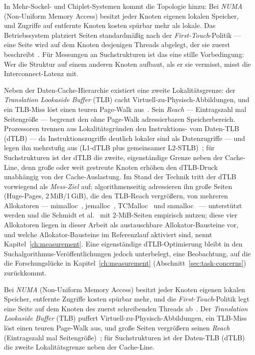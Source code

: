\begin{nurlang}
In Mehr-Sockel- und Chiplet-Systemen kommt die Topologie hinzu: Bei \emph{NUMA} (Non-Uniform Memory
Access) besitzt jeder Knoten eigenen lokalen Speicher, und Zugriffe auf entfernte Knoten kosten
spürbar mehr als lokale. Das Betriebssystem platziert Seiten standardmäßig nach der
\emph{First-Touch}-Politik --- eine Seite wird auf dem Knoten desjenigen Threads abgelegt, der sie zuerst
beschreibt~\cite{lameter2013numa}. Für Messungen an Suchstrukturen ist das eine stille Vorbedingung:
Wer die Struktur auf einem anderen Knoten aufbaut, als er sie vermisst, misst die
Interconnect-Latenz mit.

Neben der Daten-Cache-Hierarchie existiert eine zweite Lokalitätsgrenze: der \emph{Translation Lookaside
Buffer} (TLB) cacht Virtuell-zu-Physisch-Abbildungen, und ein TLB-Miss löst einen teuren Page-Walk
aus~\cite{hennessy2019architecture}. Sein \emph{Reach} --- Eintragszahl mal Seitengröße --- begrenzt
den ohne Page-Walk adressierbaren Speicherbereich. Prozessoren trennen aus Lokalitätsgründen den Instruktions- vom
Daten-TLB (dTLB) --- da Instruktionszugriffe deutlich lokaler sind als Datenzugriffe --- und legen ihn
mehrstufig aus (L1-dTLB plus gemeinsamer L2-STLB)~\cite{intel_sdm,drepper2007memory}; für Suchstrukturen ist
der dTLB die zweite, eigenständige Grenze neben der Cache-Line, denn große oder weit gestreute Knoten
erhöhen den dTLB-Druck unabhängig von der Cache-Auslastung. Im Stand der Technik tritt der dTLB vorwiegend als \emph{Mess-Ziel}
auf; algorithmenseitig adressieren ihn große Seiten (Huge-Pages, 2\,MiB/1\,GiB), die den TLB-Reach
vergrößern, von mehreren Allokatoren --- mimalloc~\cite{leijen2019mimalloc}, jemalloc~\cite{evans2006jemalloc},
TCMalloc~\cite{hunter2021temeraire} und snmalloc~\cite{lietar2019snmalloc} --- unterstützt werden und die
Schmidt et al.~\cite{schmidt2025hbm} mit 2-MiB-Seiten empirisch nutzen; diese vier Allokatoren liegen in
dieser Arbeit als austauschbare Allokator-Bausteine vor, und welche Allokator-Bausteine
im Referenzlauf aktiviert sind, nennt Kapitel~\ref{ch:measurement}. Eine eigenständige dTLB-Optimierung bleibt in den
Suchalgorithmus-Veröffentlichungen jedoch unterbelegt, eine Beobachtung, auf die die Forschungslücke in
Kapitel~\ref{ch:measurement} (Abschnitt~\ref{sec:task-concerns}) zurückkommt.
\end{nurlang}
\begin{nurkurz}
Bei \emph{NUMA} (Non-Uniform Memory Access) besitzt jeder Knoten eigenen lokalen Speicher, entfernte Zugriffe
kosten spürbar mehr, und die \emph{First-Touch}-Politik legt eine Seite auf dem Knoten des zuerst schreibenden
Threads ab~\cite{lameter2013numa}. Der \emph{Translation Lookaside Buffer} (TLB) puffert
Virtuell-zu-Physisch-Abbildungen, ein TLB-Miss löst einen teuren Page-Walk aus, und große Seiten vergrößern seinen
\emph{Reach} (Eintragszahl mal Seitengröße)~\cite{hennessy2019architecture}; für Suchstrukturen ist der Daten-TLB
(dTLB) die zweite Lokalitätsgrenze neben der Cache-Line.
\end{nurkurz}

